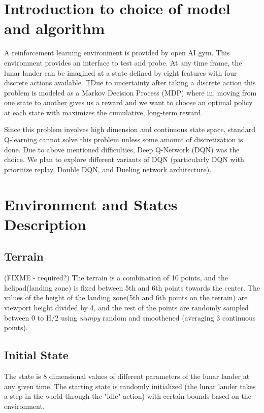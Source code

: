 \section{Introduction to choice of model and algorithm}
\label{intro}
A reinforcement learning environment is provided by open AI gym. This environment provides an interface to  test and probe. At any time frame, the lunar lander can be imagined at a state defined by eight features with four discrete actions available. TDue to uncertainty after taking a discrete action this problem is modeled as a Markov Decision Process (MDP) where in, moving from one state to another gives us a reward and we want to choose an optimal policy at each state with maximizes the cumulative, long-term reward.

Since this problem involves high dimension and continuous state space, standard Q-learning cannot solve this problem unless some amount of discretization is done. Due to above mentioned difficulties, Deep Q-Network (DQN) was the choice. We  plan to explore different variants of DQN (particularly DQN with prioritize replay, Double DQN, and Dueling network architecture).


\section{Environment and States Description}

\subsection{Terrain} 
(FIXME - required?)
The terrain is a combination of 10 points, and the helipad(landing zone) is fixed between 5th and 6th points towards the center. The values of the height of the landing zone(5th and 6th points on the terrain) are viewport height divided by 4, and the rest of the points are randomly sampled between 0 to H/2 using \textit{numpy} random and smoothened (averaging 3 continuous points).

\subsection{Initial State}

The state is 8 dimensional values of different parameters of the lunar lander at any given time. The starting state is randomly initialized (the lunar lander takes a step in the world through the "idle" action) with certain bounds based on the environment.

